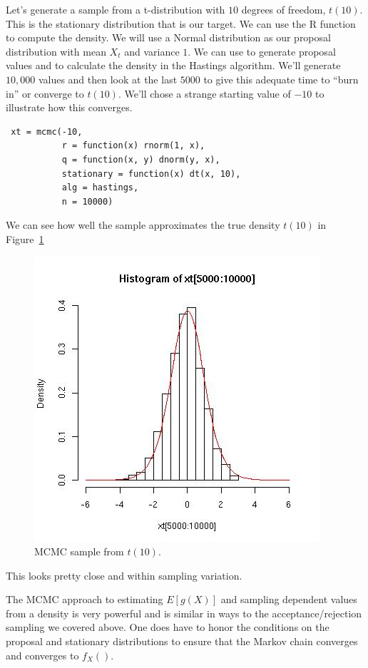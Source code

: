 Let's generate a sample from a t-distribution with $10$ degrees of
freedom, $t(10)$.  This is the stationary distribution that is our
target.  We can use the R function  to compute the
density.  We will use a Normal distribution as our proposal
distribution with mean $X_t$ and variance $1$.  We can use
 to generate proposal values and  to
calculate the density in the Hastings algorithm.
We'll generate $10,000$ values and then look at the last
$5000$ to give this adequate time to ``burn in'' or converge
to $t(10)$. We'll chose a strange starting value of $-10$
to illustrate how this converges.
\begin{verbatim}
 xt = mcmc(-10, 
           r = function(x) rnorm(1, x), 
           q = function(x, y) dnorm(y, x), 
           stationary = function(x) dt(x, 10), 
           alg = hastings, 
           n = 10000)
\end{verbatim}
We can see how well the sample approximates the
true density $t(10)$ in Figure~\ref{fig:mcmcT10.jpg}

\begin{figure}[htbp]
  \begin{center}
    \leavevmode
    \includegraphics{RNG/images/mcmcT10.jpg}
    \caption{MCMC sample from $t(10)$.}
    \label{fig:mcmcT10.jpg}
  \end{center}
\end{figure}
This looks pretty close and within sampling variation.


The MCMC  approach to estimating $E[g(X)]$ and sampling dependent
values from a density is very powerful and is similar in ways to the
acceptance/rejection sampling we covered above.  One does have to
honor the conditions on the proposal and stationary distributions to
ensure that the Markov chain converges and converges to $f_X()$.


